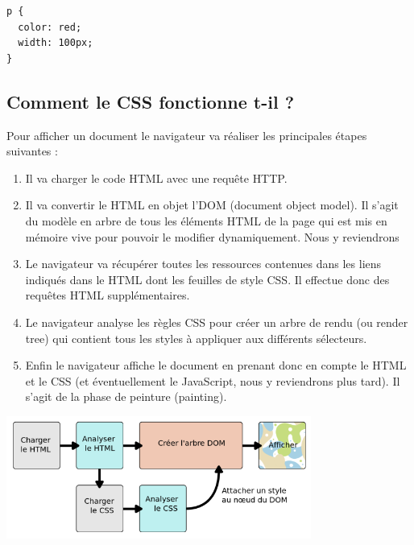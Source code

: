 \documentclass[a4paper]{article}
\begin{document}
\begin{verbatim}
p {
  color: red;
  width: 100px;
}
\end{verbatim}

\subsection{Comment le {\color{monOrange}CSS} fonctionne t-il ?}
Pour afficher un {\color{monOrange}document} le navigateur va réaliser les principales étapes suivantes :
\begin{enumerate}
\item  Il va charger le code {\color{monOrange}HTML} avec une requête {\color{monOrange}HTTP}.

\item  Il va convertir le {\color{monOrange}HTML} en objet l'{\color{monOrange}DOM (document object model)}. Il s'agit du modèle en arbre de tous les éléments {\color{monOrange}HTML} de la page qui est mis en mémoire vive pour pouvoir le modifier dynamiquement. Nous y reviendrons

\item   Le navigateur va récupérer toutes les ressources contenues dans les liens indiqués dans le {\color{monOrange}HTML} dont les feuilles de style {\color{monOrange}CSS}. Il effectue donc des requêtes {\color{monOrange}HTML} supplémentaires.

\item   Le navigateur analyse les règles {\color{monOrange}CSS} pour créer un arbre de rendu (ou render tree) qui contient tous les styles à appliquer aux différents sélecteurs.

\item   Enfin le navigateur affiche le {\color{monOrange}document} en prenant donc en compte le {\color{monOrange}HTML} et le {\color{monOrange}CSS} (et éventuellement le {\color{monOrange}JavaScript}, nous y reviendrons plus tard). Il s'agit de la phase de peinture ({\color{monOrange}painting}).
\end{enumerate}


\begin{center}
\includegraphics[width=10cm]{images/image08.png}
\end{center}
\end{document}
